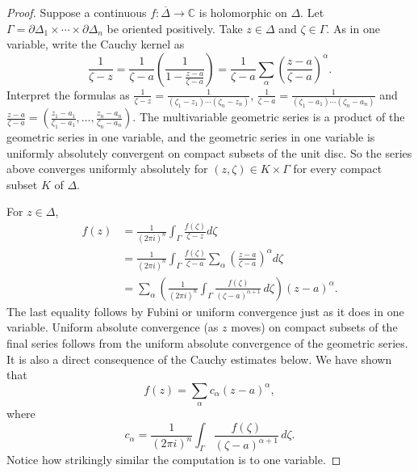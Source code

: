 \documentclass[12pt,openany]{book}
\newcommand{\C}{{\mathbb{C}}}
\theoremstyle{plain}
\theoremstyle{remark}
\theoremstyle{definition}
\theoremstyle{exercise}
\theoremstyle{example}
\begin{document}
\begin{proof}
Suppose a continuous $f \colon \overline{\Delta} \to \C$ is holomorphic on $\Delta$.
Let
$\Gamma = \partial \Delta_1 \times \cdots \times \partial \Delta_n$
be oriented positively.
Take $z \in \Delta$ and $\zeta \in \Gamma$.
As in one variable, write the Cauchy kernel as
\begin{equation*}
\frac{1}{\zeta-z} =
\frac{1}{\zeta-a}
\left(
\frac{1}{1-\frac{z-a}{\zeta-a}}
\right)
=
\frac{1}{\zeta-a}
\sum_{\alpha}
{\left(\frac{z-a}{\zeta-a}\right)}^\alpha .
\end{equation*}
Interpret the formulas as
$\frac{1}{\zeta-z} = \frac{1}{(\zeta_1-z_1) \cdots (\zeta_n-z_n)}$,
$\frac{1}{\zeta-a} = \frac{1}{(\zeta_1-a_1) \cdots (\zeta_n-a_n)}$
and
$\frac{z-a}{\zeta-a} =
\left(
\frac{z_1-a_1}{\zeta_1-a_1}, \ldots,
\frac{z_n-a_n}{\zeta_n-a_n}
\right)$.
The multivariable geometric series is a product of the geometric series
in one variable, and the geometric series in one variable
is uniformly absolutely convergent on compact subsets of the unit disc.
So the series
above converges uniformly absolutely for $(z,\zeta) \in K \times \Gamma$
for every compact subset $K$ of $\Delta$.

For $z \in \Delta$,
\begin{equation*}
\begin{split}
f(z)
& =
\frac{1}{{(2\pi i)}^n}
\int_{\Gamma}
\frac{f(\zeta)}{\zeta-z}
d \zeta
\\
& =
\frac{1}{{(2\pi i)}^n}
\int_{\Gamma}
\frac{f(\zeta)}{\zeta-a}
\sum_{\alpha}
{\left(\frac{z-a}{\zeta-a}\right)}^{\alpha}
d \zeta
\\
& =
\sum_{\alpha}
\left(
\frac{1}{{(2\pi i)}^n}
\int_{\Gamma}
\frac{f(\zeta)}{{(\zeta-a)}^{\alpha+1}}
\,
d \zeta
\right)
{(z-a)}^{\alpha} .
\end{split}
\end{equation*}
The last equality follows by Fubini or uniform convergence just as it does in one variable.
Uniform absolute convergence (as $z$ moves) on compact subsets of the final
series follows from the
uniform absolute convergence of the geometric series.  It is also a direct
consequence of the Cauchy estimates below.
We have shown that
\begin{equation*}
f(z) =
\sum_{\alpha}
c_{\alpha}
{(z-a)}^{\alpha} ,
\end{equation*}
where
\begin{equation*}
c_\alpha
=
\frac{1}{{(2\pi i)}^n}
\int_{\Gamma}
\frac{f(\zeta)}{{(\zeta-a)}^{\alpha+1}}
\,
d \zeta .
\end{equation*}
Notice how strikingly similar the computation is to one variable.


\end{proof}
\end{document}

